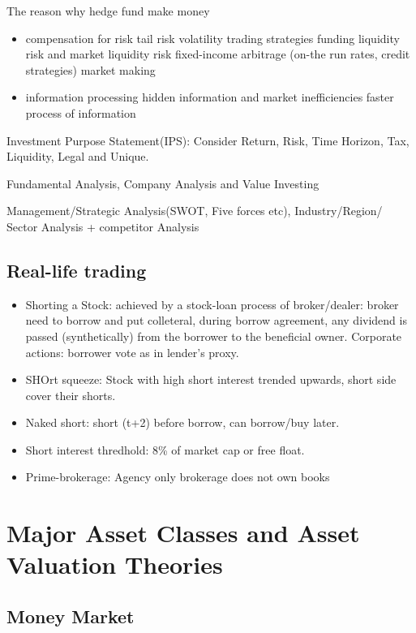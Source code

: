 \documentclass[11pt, openany]{book}              %
\begin{document}
The reason why hedge fund make money
\begin{itemize}
	\item compensation for risk
	\subitem tail risk
		\subsubitem volatility trading strategies
	\subitem funding liquidity risk and market liquidity risk
		\subsubitem fixed-income arbitrage (on-the run rates, credit strategies)
		\subsubitem market making
	\item information processing
		\subitem hidden information and market inefficiencies
		\subitem faster process of information
\end{itemize}

Investment Purpose Statement(IPS): Consider Return, Risk, Time Horizon, Tax, Liquidity, Legal and Unique. 


Fundamental Analysis, Company Analysis and Value Investing

Management/Strategic Analysis(SWOT, Five forces etc), Industry/Region/ Sector Analysis + competitor Analysis 

\section{Real-life trading}

\begin{itemize}
    \item Shorting a Stock: achieved by a stock-loan process of broker/dealer: broker need to borrow and put colleteral, during borrow agreement, any dividend is passed (synthetically) from the borrower to the beneficial owner. Corporate actions: borrower vote as in lender's proxy. 
    \item SHOrt squeeze: Stock with high short interest trended upwards, short side cover their shorts.
    \item Naked short: short (t+2) before borrow, can borrow/buy later.
    \item Short interest thredhold: 8\% of market cap or free float.
    \item Prime-brokerage: Agency only brokerage does not own books
\end{itemize}

\chapter{Major Asset Classes and Asset Valuation Theories}
\section{Money Market}
\end{document}
